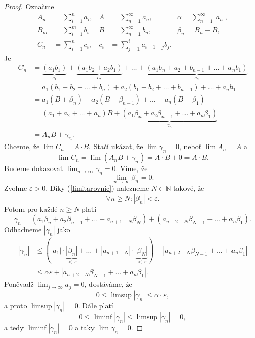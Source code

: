 \begin{proof}
	Označme
	\begin{align*}
		A_n &= \sum_{i=1}^na_i, & A &= \sum_{n=1}^\infty a_n, & \alpha = \sum_{n=1}^\infty|a_n|,\\
	 B_m &= \sum_{i=1}^m b_i & B &= \sum_{n=1}^\infty b_n, & \beta _n = B_n-B,\\
	 C_n &= \sum_{i=1}^n c_i, &  c_i &= \sum_{j=1}^i a_{i+1-j}b_j.
\end{align*}
Je
\begin{align*}
C_n &= \underbrace{(a_1b_1)}_{c_1} + \underbrace{(a_1b_2+a_2b_1)}_{c_2} + \dots + \underbrace{(a_1b_n + a_2 + b_{n-1}+ \dots + a_nb_1)}_{c_n}\\
&= a_1(b_1+b_2+\dots +b_n) + a_2(b_1+b_2+\dots+b_{n-1}) +\dots + a_nb_1\\
&= a_1 (B+ \beta_n) + a_2 (B+ \beta_{n-1}) +\dots +a_n(B+\beta_1)\\
&= (a_1+a_2+\dots+a_n)B + \underbrace{(a_1\beta_n + a_2\beta_{n-1} +\dots + a_n\beta_1)}_{\gamma_n}\\
&= A_nB+\gamma_n.
\end{align*}
Chceme, že $\lim C_n = A\cdot B$. Stačí ukázat, že $\lim \gamma_n = 0$, neboť
$
    \lim A_n = A
$ a
$$
    \lim C_n = \lim (A_nB+\gamma_n) = A\cdot B + 0 = A\cdot B.
$$
Budeme dokazovat $\lim_{n\to \infty} \gamma_n = 0$. Víme, že
\begin{equation}\label{limitarovnic}
    \lim_{n \to \infty} \beta _n = 0.
\end{equation}
Zvolme $\varepsilon > 0$. Díky (\ref{limitarovnic}) nalezneme $N \in \mathbb N $ takové, že
$$
    \forall n \geq N: |\beta_n|< \varepsilon.
$$
Potom pro každé $n\geq N$ platí
$$
    \gamma_n = (a_1\beta_n+a_2\beta_{n-1}+\dots+a_{n+1-N}\beta_N)+ (a_{n+2-N}\beta_{N-1} +\dots + a_n\beta_1).
$$
Odhadneme $|\gamma_n|$ jako
\begin{align*}
|\gamma_n| &\leq (|a_1|\cdot \underbrace{|\beta_n|}_{<\,\varepsilon} + \dots + |a_{n+1-N}|\cdot \underbrace{|\beta_N|}_{<\,\varepsilon})+ |a_{n+2-N}\beta_{N-1} +\dots + a_n\beta_1|\\
& \leq \alpha \varepsilon + |a_{n+2-N}\beta_{N-1} +\dots + a_n\beta_1|.
\end{align*}
Poněvadž $\lim_{j\to \infty} a_j = 0$, dostáváme, že
$$
0\leq \limsup |\gamma_n| \leq \alpha \cdot \varepsilon,
$$
a proto $\limsup |\gamma_n| = 0$. Dále platí
$$
    0 \leq \liminf |\gamma_n| \leq \limsup |\gamma_n|  = 0,
$$
a tedy $\liminf |\gamma _n| = 0$ a taky $\lim \gamma _n = 0$.
\end{proof}



